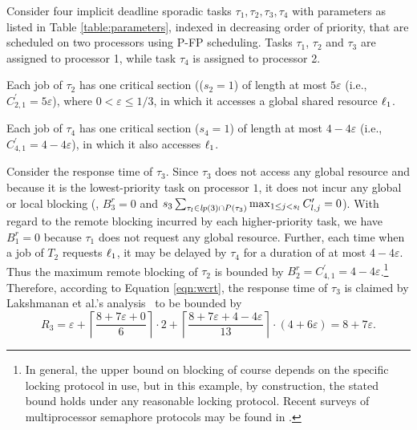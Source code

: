 Consider four implicit deadline sporadic tasks ${\tau_1, \tau_2, \tau_3, \tau_4}$ with parameters as listed in Table \ref{table:parameters}, indexed in decreasing order of priority, that are scheduled on two processors using P-FP scheduling. Tasks $\tau_1$, $\tau_2$ and $\tau_3$ are assigned to processor 1, while task $\tau_4$ is assigned to processor 2.

Each job of $\tau_2$ has one critical section (($s_2 = 1$) of length at most $5\varepsilon$ (i.e., $C_{2,1}^{\prime} = 5\varepsilon$), where $0 < \varepsilon \leq 1/3$, in which it accesses a global shared resource $\ell_1$.

Each job of $\tau_4$ has one critical section ($s_4 = 1$) of length at most $4-4\varepsilon$ (i.e., $C_{4,1}^{\prime} = 4-4\varepsilon$), in which it also accesses $\ell_1$.

Consider the response time of $\tau_3$. Since $\tau_3$ does not access any global resource and because it is the lowest-priority task on processor $1$, it does not incur any global or local blocking (\ie, $B_3^r = 0$ and $s_3 \sum_{\tau_l \in \mathit{lp}(3) \cap P(\tau_3)} \max_{1 \leq j < s_l} C_{l,j}^{\prime} = 0$). With regard to the remote blocking incurred by each higher-priority task, we have $B_1^r = 0$ because $\tau_1$ does not request any global resource. Further, each time when a job of $T_2$ requests $\ell_1$, it may be delayed by $\tau_4$ for a duration of at most $4-4\varepsilon$. Thus the maximum remote blocking of $\tau_2$ is bounded by $B_2^r = C_{4,1}^{\prime} = 4-4\varepsilon$.\footnote{In general, the upper bound on blocking of course depends on the specific locking protocol in use, but in this example, by construction, the stated bound holds under any reasonable locking protocol. Recent surveys of multiprocessor semaphore protocols may be found in \cite{bbb-2013,yang-2015}.} Therefore, according to Equation \ref{eqn:wcrt}, the response time of $\tau_3$ is claimed by  Lakshmanan et al.'s analysis~\cite{lakshmanan-2009} to be bounded by
\begin{equation*}
R_3 = \varepsilon + \left \lceil \frac{8+7\varepsilon + 0}{6} \right \rceil \cdot 2 + \left \lceil \frac{8+7\varepsilon + 4-4\varepsilon}{13} \right \rceil \cdot (4+6\varepsilon) = 8+7\varepsilon.
\end{equation*}

